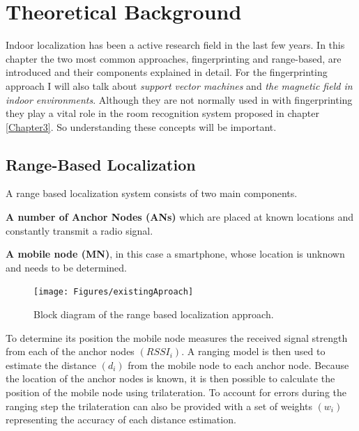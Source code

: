 
\chapter{Theoretical Background} %

\label{Chapter2} %

Indoor localization has been a active research field in the last few years. In this chapter the two most common approaches, fingerprinting and range-based, are introduced and their components explained in detail. For the fingerprinting approach I will also talk about \emph{support vector machines} and \emph{the magnetic field in indoor environments}. Although they are not normally used in with fingerprinting they play a vital role in the room recognition system proposed in chapter \ref{Chapter3}. So understanding these concepts will be important.

\section{Range-Based Localization}

A range based localization system consists of two main components.

\textbf{A number of Anchor Nodes (ANs)} which are placed at known locations and constantly transmit a radio signal.

\textbf{A mobile node (MN)}, in this case a smartphone, whose location is unknown and needs to be determined.

\begin{figure}[ht]
\centering
\texttt{[image: Figures/existingAproach]}
\decoRule
\caption[Range-based localization approach]{Block diagram of the range based localization approach.}
\label{fig:existingApproach}
\end{figure}

To determine its position the mobile node measures the received signal strength from each of the anchor nodes $(RSSI_i)$. A ranging model is then used to estimate the distance $(d_i)$ from the mobile node to each anchor node. Because the location of the anchor nodes is known, it is then possible to calculate the position of the mobile node using trilateration. To account for errors during the ranging step the trilateration can also be provided with a set of weights $(w_i)$ representing the accuracy of each distance estimation.

